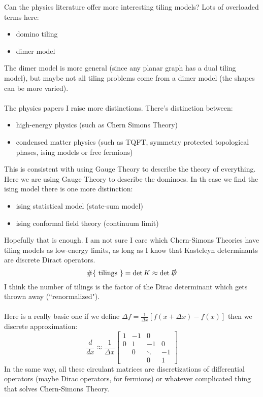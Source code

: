 \documentclass[12pt]{article}
\begin{document}
\noindent Can the physics literature offer more interesting tiling models?  Lots of overloaded terms here:
\begin{itemize}
\item domino tiling
\item dimer model
\end{itemize}
The dimer model is more general (since any planar graph has a dual tiling model), but maybe not all tiling problems come from a dimer model (the shapes can be more varied). \\ \\
The physics papers I raise more distinctions.  There's distinction between:
\begin{itemize}
\item high-energy physics (such as Chern Simons Theory)
\item condensed matter physics (such as TQFT, symmetry protected topological phases, ising models or free fermions)
\end{itemize}
This is consistent with using Gauge Theory to describe the theory of everything.  Here we are using Gauge Theory to describe the dominoes.  In th case we find the ising model there is one more distinction:
\begin{itemize}
\item ising statistical model (state-sum model)
\item ising conformal field theory (continuum limit)
\end{itemize}
Hopefully that is enough.  I am not sure I care which Chern-Simons Theories have tiling models as low-energy limits, as long as I know that Kasteleyn determinants are discrete Diract operators.
$$ \#\{\text{ tilings }\} = \det K  \approx \det \slashed{D} $$
I think the number of tilings is the factor of the Dirac determinant which gets thrown away (``renormalized"). \\ \\
Here is a really basic one if we define $\Delta f = \frac{1}{\Delta x}[f(x+\Delta x) - f(x)]$ then we discrete approximation:
$$ \frac{d}{dx} \approx \frac{1}{\Delta x} \left[  
\begin{array}{rrrr} 
1 & -1 & 0 &  \\
0 & 1 & -1 & 0 \\ 
 & 0 & \ddots & -1  \\
 &  & 0 & 1 
\end{array}\right] $$
In the same way, all these circulant matrices are discretizations of differential operators (maybe Dirac operators, for fermions) or whatever complicated thing that solves Chern-Simons Theory.
\end{document}
